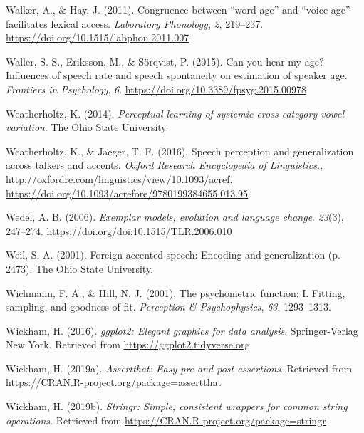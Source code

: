 \documentclass[
  11pt,
  man,floatsintext]{apa6}
\newlength{\cslhangindent}
\newlength{\cslentryspacingunit} %
\newenvironment{CSLReferences}[2] %
 {%
  \setlength{\parindent}{0pt}
  \ifodd #1
  \let\oldpar\par
  \def\par{\hangindent=\cslhangindent\oldpar}
  \fi
  \setlength{\parskip}{#2\cslentryspacingunit}
 }%
 {}
\begin{document}
\begin{CSLReferences}{1}{0}
\leavevmode{}%
Walker, A., \& Hay, J. (2011). Congruence between {``word age''} and {``voice age''} facilitates lexical access. \emph{Laboratory Phonology}, \emph{2}, 219--237. \url{https://doi.org/10.1515/labphon.2011.007}

\leavevmode{}%
Waller, S. S., Eriksson, M., \& Sörqvist, P. (2015). Can you hear my age? Influences of speech rate and speech spontaneity on estimation of speaker age. \emph{Frontiers in Psychology}, \emph{6}. \url{https://doi.org/10.3389/fpsyg.2015.00978}

\leavevmode{}%
Weatherholtz, K. (2014). \emph{Perceptual learning of systemic cross-category vowel variation}. The Ohio State University.

\leavevmode{}%
Weatherholtz, K., \& Jaeger, T. F. (2016). Speech perception and generalization across talkers and accents. \emph{Oxford Research Encyclopedia of Linguistics.}, http://oxfordre.com/linguistics/view/10.1093/acref. \url{https://doi.org/10.1093/acrefore/9780199384655.013.95}

\leavevmode{}%
Wedel, A. B. (2006). \emph{Exemplar models, evolution and language change}. \emph{23}(3), 247--274. \url{https://doi.org/doi:10.1515/TLR.2006.010}

\leavevmode{}%
Weil, S. A. (2001). Foreign accented speech: Encoding and generalization (p. 2473). The Ohio State University.

\leavevmode{}%
Wichmann, F. A., \& Hill, N. J. (2001). The psychometric function: I. Fitting, sampling, and goodness of fit. \emph{Perception \& Psychophysics}, \emph{63}, 1293--1313.

\leavevmode{}%
Wickham, H. (2016). \emph{ggplot2: Elegant graphics for data analysis}. Springer-Verlag New York. Retrieved from \url{https://ggplot2.tidyverse.org}

\leavevmode{}%
Wickham, H. (2019a). \emph{Assertthat: Easy pre and post assertions}. Retrieved from \url{https://CRAN.R-project.org/package=assertthat}

\leavevmode{}%
Wickham, H. (2019b). \emph{Stringr: Simple, consistent wrappers for common string operations}. Retrieved from \url{https://CRAN.R-project.org/package=stringr}


\end{CSLReferences}
\end{document}

